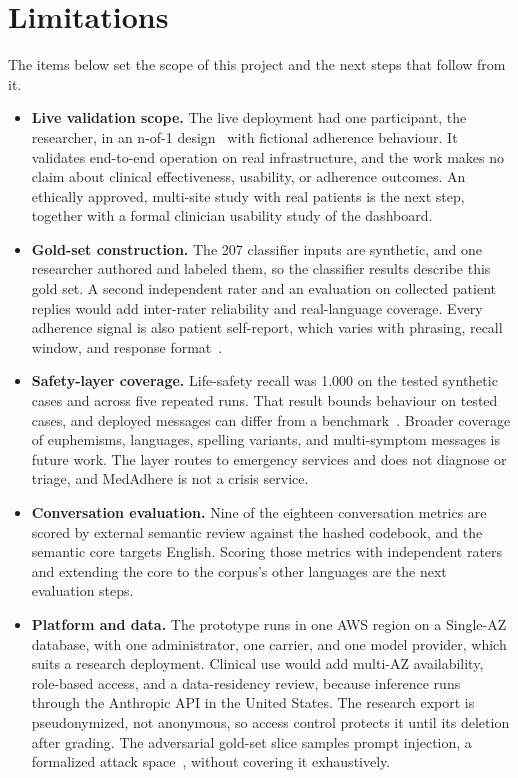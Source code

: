\chapter{Limitations}
\label{ch:limitations}

The items below set the scope of this project and the next steps that follow
from it.

\begin{itemize}
  \item \textbf{Live validation scope.} The live deployment had one
    participant, the researcher, in an n-of-1 design~\cite{vohra2015cent} with
    fictional adherence behaviour. It validates end-to-end operation on real
    infrastructure, and the work makes no claim about clinical effectiveness,
    usability, or adherence outcomes. An ethically approved, multi-site study
    with real patients is the next step, together with a formal clinician
    usability study of the dashboard.
  \item \textbf{Gold-set construction.} The 207 classifier inputs are
    synthetic, and one researcher authored and labeled them, so the classifier
    results describe this gold set. A second independent rater and an
    evaluation on collected patient replies would add inter-rater reliability
    and real-language coverage. Every adherence signal is also patient
    self-report, which varies with phrasing, recall window, and response
    format~\cite{stirratt2015selfreport}.
  \item \textbf{Safety-layer coverage.} Life-safety recall was 1.000 on the
    tested synthetic cases and across five repeated runs. That result bounds
    behaviour on tested cases, and deployed messages can differ from a
    benchmark~\cite{bedi2025testing}. Broader coverage of euphemisms,
    languages, spelling variants, and multi-symptom messages is future work.
    The layer routes to emergency services and does not diagnose or triage,
    and MedAdhere is not a crisis service.
  \item \textbf{Conversation evaluation.} Nine of the eighteen conversation
    metrics are scored by external semantic review against the hashed
    codebook, and the semantic core targets English. Scoring those metrics
    with independent raters and extending the core to the corpus's other
    languages are the next evaluation steps.
  \item \textbf{Platform and data.} The prototype runs in one AWS region on a
    Single-AZ database, with one administrator, one carrier, and one model
    provider, which suits a research deployment. Clinical use would add
    multi-AZ availability, role-based access, and a data-residency review,
    because inference runs through the Anthropic API in the United States. The
    research export is pseudonymized, not anonymous, so access control
    protects it until its deletion after grading. The adversarial gold-set
    slice samples prompt injection, a formalized attack
    space~\cite{liu2024promptinjection}, without covering it exhaustively.
\end{itemize}
